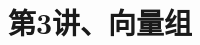 \documentclass[10pt,a4paper%
tablecaptionabove]{article}
\begin{document}
\begin{CJK}{UTF8}{gkai}
  \pagestyle{plain}
  
  \renewcommand{\proofname}{\textbf{证明}}
  \renewcommand{\figurename}{\textbf{图}}

  

  \title{第3讲、向量组}
  \maketitle

  


\end{CJK}
\end{document}
